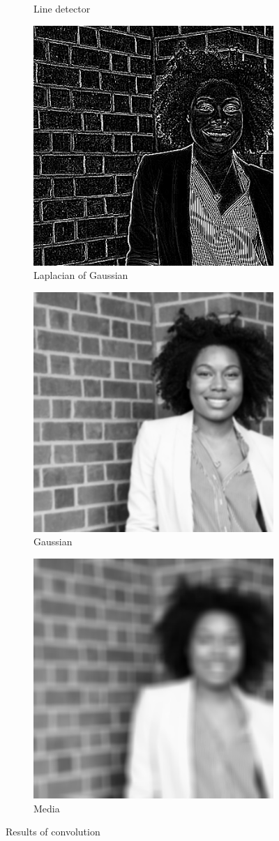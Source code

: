 \begin{figure}[h!]
\begin{subfigure}{0.3\textwidth}
  \caption{Line detector}
\end{subfigure}%
\begin{subfigure}{0.3\textwidth}
  \centering
  \includegraphics[width=0.9\linewidth]{output/laplasOfGaussi.jpg}
  \caption{Laplacian of Gaussian}
\end{subfigure}
\begin{subfigure}{0.5\textwidth}
  \centering
  \includegraphics[width=0.5\linewidth]{output/gaussian.jpg}
  \caption{Gaussian}
\end{subfigure}%
\begin{subfigure}{0.5\textwidth}
  \centering
  \includegraphics[width=0.5\linewidth]{output/media.jpg}
  \caption{Media} 
\end{subfigure}
 \caption{Results of convolution}
\label{fig:conv-results}
\end{figure}

